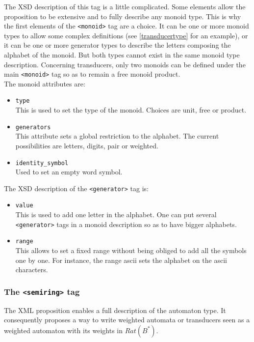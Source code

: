\documentclass[a4paper]{article}
\def\monoidtag{\texttt{<monoid>}}
\def\semiringtag{\texttt{<semiring>}}
\def\generatortag{\texttt{<generator>}}
\begin{document}
The XSD description of this tag is a little complicated. Some elements
allow the proposition to be extensive and to fully describe any monoid
type. This is why the first elements of the \monoidtag{} tag are a
choice. It can be one or more monoid types to allow some complex
definitions (see \autoref{transducertype} for an example), or it can
be one or more generator types to describe the letters composing the
alphabet of the monoid. But both types cannot exist in the same monoid
type description. Concerning transducers, only two monoids can be
defined under the main \monoidtag{} tag so as to remain a
free monoid product.\\

The monoid attributes are:
\begin{itemize}
  \item \texttt{type}\\
This is used to set the type of the monoid. Choices are unit, free or product.
  \item \texttt{generators}\\
This attribute sets a global restriction to the alphabet. The current possibilities
are letters, digits, pair or weighted.
  \item \texttt{identity\_symbol}\\
Used to set an empty word symbol.
\end{itemize}
\newpage

The XSD description of the \generatortag{} tag is:
\begin{itemize}
  \item \texttt{value}\\
This is used to add one letter in the alphabet. One can put several
\generatortag{} tags in a monoid description so as to have bigger alphabets.
  \item \texttt{range}\\
This allows to set a fixed range without being obliged to add all the symbols
one by one. For instance, the range ascii sets the alphabet on the ascii
characters.
\end{itemize}

\subsubsection{The \semiringtag{} tag}

The XML proposition enables a full description of the automaton type.
It consequently proposes a way to write weighted automata or transducers
seen as a weighted automaton with its weights in $Rat(B^*)$.\\
\end{document}
